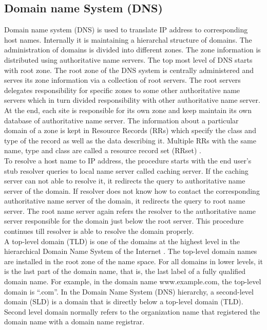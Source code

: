 \subsection{Domain name System (DNS)}
\noindent Domain name system (DNS) is used to translate IP address to corresponding
host names. Internally it is maintaining a hierarchal structure of domains. The administration of domains is divided into different zones. The zone information is distributed using authoritative name servers. The top most level of DNS starts with root zone. The root zone of the DNS
system is centrally administered and serves its zone information via a collection of
root servers. The root servers delegates responsibility for specific zones to some other authoritative name servers which in turn divided responsibility with other authoritative name server. At the end, each site is responsible for its own zone and keep maintain its own database of authoritative name server. The information about a particular domain of a zone is kept in Resource Records (RRs) which specify the class and type of the record as well as the data describing it. Multiple RRs with the same name, type and class are called a resource record set (RRset) \cite {Frank} \cite{Mike4}.\\

\noindent To resolve a host name to IP address, the procedure starts with the end
user’s stub resolver queries to local name server called caching server. If the caching
server can not able to resolve it, it redirects the query to authoritative name server
of the domain. If resolver does not know how to contact the corresponding authoritative name server of the domain, it redirects the query to root name server. The root name server again refers the resolver to the authoritative name server responsible for the domain just below the root server. This procedure continues till resolver is able to resolve the domain properly.\\

\noindent A top-level domain (TLD) is one of the domains at the highest level in the hierarchical Domain Name System of the Internet \cite{dns}. The top-level domain names are installed in the root zone of the name space. For all domains in lower levels, it is the last part of the domain name, that is, the last label of a fully qualified domain name. For example, in the domain name www.example.com, the top-level domain is \enquote{.com}. In the Domain Name System (DNS) hierarchy, a second-level domain (SLD) is a domain that is directly below a top-level domain (TLD). Second level domain normally refers to the organization name that registered the domain name with a domain name registrar.\\

